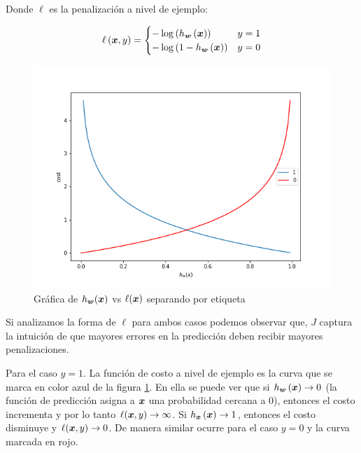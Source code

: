 Donde $\ell$ es la penalización a nivel de ejemplo:

\begin{align}
    \ell\left( \boldsymbol{x}, y \right) =
    \begin{cases}
        - \log\left( h_{\boldsymbol{w}}\left( \boldsymbol{x} \right) \right) & y = 1 \\
        - \log\left(1 - h_{\boldsymbol{w}}\left( \boldsymbol{x} \right) \right) & y = 0
    \end{cases}
\end{align}

\begin{figure}
    \centering
    \includegraphics[scale=0.5]{figures/logistic_regression_loss.png}
    \caption{Gráfica de $h_{\boldsymbol{w}}(\boldsymbol{x})$ vs $\ell(\boldsymbol{x})$ separando por etiqueta}
    \label{fig:lgr_loss}
\end{figure}

Si analizamos la forma de $\ell$ para ambos casos podemos observar que, $J$
captura la intuición de que mayores errores en la predicción deben recibir
mayores penalizaciones.

Para el caso $y = 1$. La función de costo a nivel de
ejemplo es la curva que se marca en color azul de la figura \ref{fig:lgr_loss}. En ella se puede ver
que si $h_{\boldsymbol{w}}\left( \boldsymbol{x} \right) \rightarrow 0$ (la función de
predicción asigna a $\boldsymbol{x}$ una probabilidad cercana a $0$), entonces el
costo incrementa y por lo tanto $\ell(\boldsymbol{x}, y) \rightarrow \infty$. Si
$h_{\boldsymbol{x}}\left( \boldsymbol{x} \right) \rightarrow 1$, entonces el costo disminuye
y $\ell(\boldsymbol{x}, y) \rightarrow 0$. De manera similar ocurre para el caso $y =
0$ y la curva marcada en rojo.

